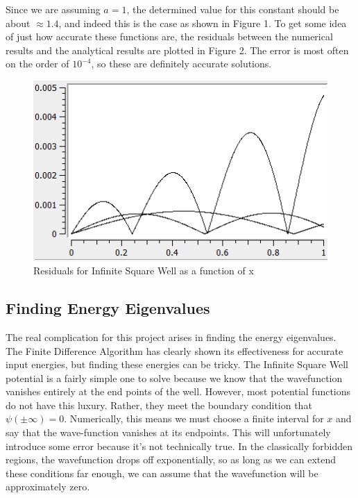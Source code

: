 \documentclass[11pt]{article} %
\begin{document}
\par Since we are assuming $a = 1$, the determined value for this constant should be about $\approx 1.4$, and indeed this is the case as shown in Figure 1.  To get some idea of just how accurate these functions are, the residuals between the numerical results and the analytical results are plotted in Figure 2. The error is most often on the order of $10^{-4}$, so these are definitely accurate solutions. 
\begin{figure}
\centering
\includegraphics{fp2}
\caption{Residuals for Infinite Square Well as a function of x}
\end{figure}
\subsection{Finding Energy Eigenvalues}
The real complication for this project arises in finding the energy eigenvalues. The Finite Difference Algorithm has clearly shown its effectiveness for accurate input energies, but finding these energies can be tricky. The Infinite Square Well potential is a fairly simple one to solve because we know that the wavefunction vanishes entirely at the end points of the well. However, most potential functions do not have this luxury. Rather, they meet the boundary condition that $\psi (\pm \infty) = 0$. Numerically, this means we must choose a finite interval for $x$ and say that the wave-function vanishes at its endpoints. This will unfortunately introduce some error because it's not technically true. In the classically forbidden regions, the wavefunction drops off exponentially, so as long as we can extend these conditions far enough, we can assume that the wavefunction will be approximately zero.
\end{document}
